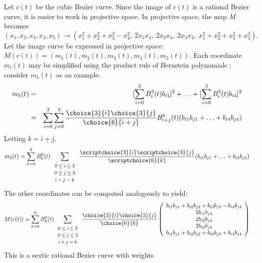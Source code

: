 \documentclass[12pt]{article}
\begin{document}
\prf
Let $c(t)$ be the cubic Bezier curve.
Since the image of $c(t)$ is a rational Bezier curve, it is easier 
to work in projective space.
In projective space, the map $M$ becomes
\[
	 (x_1,x_2,x_3,x_4,x_5) \rightarrow
	 (x_1^2 + x_2^2 + x_3^2 - x_4^2,\ 
	 2x_1 x_4,\ 2x_2 x_4,\ 2x_3 x_4,\ 
	 x_1^2 + x_2^2 + x_3^2 + x_4^2).
\]
Let the image curve be expressed in projective space: 
$M(c(t)) = (m_1(t),m_2(t),m_3(t),m_4(t),m_5(t))$.
Each coordinate $m_i(t)$ may be simplified using the product rule 
of Bernstein polynomials \cite{farin02};
consider $m_5(t)$ as an example.
\begin{eqnarray}
m_5(t) & = & [\sum_{i=0}^3 B_i^3(t) b_{i1}]^2 + 
	\ldots + [\sum_{i=0}^3 B_i^3(t) b_{i4}]^2 \nonumber \\
     & = &  \sum_{i=0}^3 \sum_{j=0}^3 
	\frac{\choice{3}{i} \choice{3}{j}}{\choice{6}{i+j}}
       B^6_{i+j}(t) (b_{i1} b_{j1} + \ldots + b_{i4} b_{j4}) \nonumber
\end{eqnarray}
Letting $k=i+j$, 
\[ m_5(t) = \sum_{k=0}^6 B_k^6(t) 
	\sum_{\begin{array}{c}  \mbox{\footnotesize{$0 \leq i \leq 3$}} \\ 
			     \mbox{\footnotesize{$0 \leq j \leq 3$}} \\ 
			     \mbox{\footnotesize{$i+j=k$}}
			     \end{array}} 
	\frac{\scriptchoice{3}{i} \scriptchoice{3}{j}}{\scriptchoice{6}{k}}
	(b_{i1} b_{j1} + \ldots + b_{i4} b_{j4}) \]
The other coordinates can be computed analogously to yield:
\[ M(c(t)) = 
   \sum_{k=0}^6 B_k^6(t)
	\sum_{\begin{array}{c}  \mbox{\footnotesize{$0 \leq i \leq 3$}} \\ 
			     \mbox{\footnotesize{$0 \leq j \leq 3$}} \\ 
			     \mbox{\footnotesize{$i+j=k$}}
			     \end{array}} 
	\frac{\choice{3}{i} \choice{3}{j}}{\choice{6}{k}}
	\left( \begin{array}{c}
            b_{i1} b_{j1} + b_{i2} b_{j2} + b_{i3} b_{j3} - b_{i4} b_{j4} \\
            2b_{i1} b_{j4} \\
            2b_{i2} b_{j4} \\
            2b_{i3} b_{j4} \\
            b_{i1} b_{j1} + b_{i2} b_{j2} + b_{i3} b_{j3} + b_{i4} b_{j4}
	\end{array} \right) \]
This is a sextic rational Bezier curve with weights 
\end{document}
